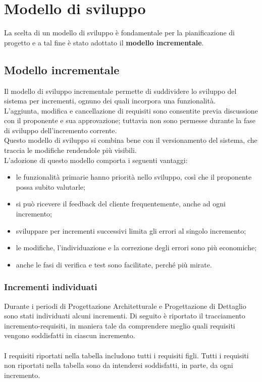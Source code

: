 \section{Modello di sviluppo}
La scelta di un modello di sviluppo è fondamentale per la pianificazione di 
progetto e a tal fine è stato adottato il \textbf{modello incrementale}.

\subsection{Modello incrementale}
Il modello di sviluppo incrementale permette di suddividere lo sviluppo del sistema per 
incrementi, ognuno dei quali incorpora una funzionalità. \\
L'aggiunta, modifica e cancellazione di requisiti sono consentite previa discussione con il proponente e sua 
approvazione; tuttavia non sono permesse durante la fase di sviluppo dell'incremento corrente.\\
Questo modello di sviluppo si combina bene con il versionamento del sistema, che traccia le modifiche rendendole più visibili.\\
L'adozione di questo modello comporta i seguenti vantaggi:
\begin{itemize}
	\item le funzionalità primarie hanno priorità nello sviluppo, così che il proponente possa subito valutarle;
	\item si può ricevere il feedback del cliente frequentemente, anche ad ogni incremento;
	\item sviluppare per incrementi successivi limita gli errori al singolo incremento;
	\item le modifiche, l'individuazione e la correzione degli errori sono più economiche;
	\item anche le fasi di verifica e test sono facilitate, perché più mirate.
\end{itemize}
\subsubsection{Incrementi individuati} Durante i periodi di Progettazione Architetturale e Progettazione di Dettaglio sono stati individuati alcuni incrementi. Di seguito è riportato il tracciamento incremento-requisiti, in maniera tale da comprendere meglio quali requisiti vengono soddisfatti in ciascun incremento. \\ \\
I requisiti riportati nella tabella includono tutti i requisiti figli. Tutti i requisiti non riportati nella tabella sono da intendersi soddisfatti, in parte, da ogni incremento. 

